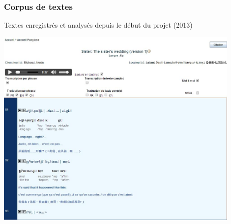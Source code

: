 \documentclass[xcolor=table]{beamer}
\begin{document}
 \begin{frame} 
 \frametitle{Corpus de textes}

Textes enregistrés et analysés depuis le début du projet (2013)

  \includegraphics[width=0.9\textwidth]{na-pangloss.jpg} \centering
   \end{frame} 
   
\end{document}

